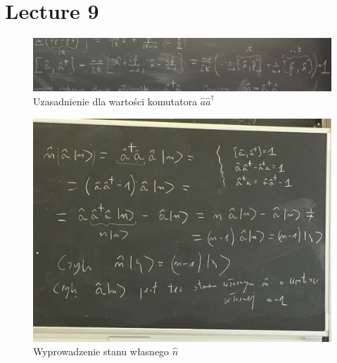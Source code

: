 \documentclass[12pt,a4paper]{report}
\begin{document}
\section{Lecture 9}

\begin{figure}[!ht]
        \centering
        \includegraphics[width=\linewidth]{App_9_Rys_1.JPG}
        \caption{Uzasadnienie dla wartości komutatora $\hat{a}\hat{a}^\dagger$}
        \label{fig:app_9:comm_kreacji_anihillacji}
\end{figure}

\begin{figure}[!ht]
        \centering
        \includegraphics[width=\linewidth]{App_9_Rys_2.JPG}
        \caption{Wyprowadzenie stanu własnego $\hat{n}$}
        \label{fig:app_9:stany_wlasne_n}
\end{figure}
\end{document}
